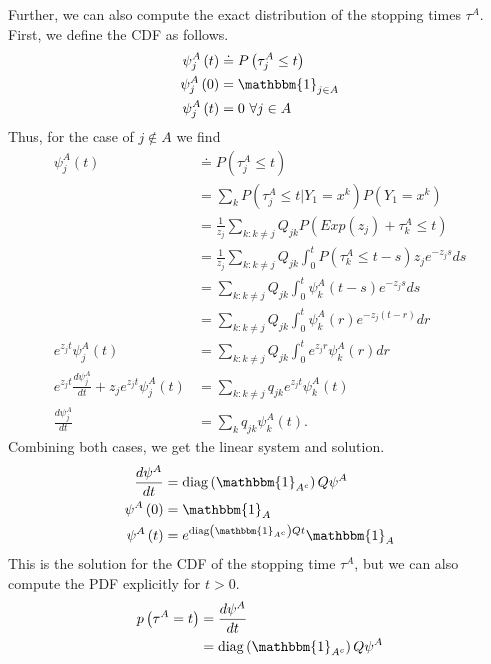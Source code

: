 Further, we can also compute the exact distribution of the stopping times $\tau^A$. First, we define the CDF as follows.
\begin{align}
\psi_j^A\left(t\right) &\doteq P\left(\tau^A_j \leq t\right) \\
\psi_j^A\left(0\right) &= \mathbbm{1}_{j\in A} \\
\psi_j^A\left(t\right) &= 0\text{  }\forall j \in A                        
\end{align}
Thus, for the case of $j \not\in A$ we find
\begin{align}
\psi_j^A\left(t\right) &\doteq P\left(\tau^A_j \leq t\right) \\
                       &= \sum_k P\left(\tau^A_j \leq t | Y_1 = x^k\right) P\left(Y_1 = x^k\right) \\ 
                       &= \frac{1}{z_j}\sum_{k: k \neq j} Q_{jk} P\left(Exp\left(z_j\right) + \tau^A_k \leq t\right)  \\
                       &= \frac{1}{z_j}\sum_{k: k \neq j} Q_{jk} \int^t_0 P\left(\tau^A_k \leq t - s\right) z_j e^{-z_j s} ds  \\
                       &= \sum_{k: k \neq j} Q_{jk} \int^t_0\psi^A_k\left(t-s\right)e^{-z_j s} ds  \\
                       &= \sum_{k: k \neq j} Q_{jk} \int^t_0\psi^A_k\left(r\right)e^{-z_j\left(t-r\right)} dr  \\
e^{z_jt}\psi^A_j\left(t\right) &= \sum_{k: k \neq j} Q_{jk} \int^t_0 e^{z_jr}\psi^A_k\left(r\right) dr  \\
e^{z_jt}\frac{d\psi^A_j}{dt} + z_j e^{z_j t} \psi^A_j\left(t\right) &= \sum_{k: k \neq j} q_{jk} e^{z_jt}\psi^A_k\left(t\right)  \\
\frac{d\psi^A_j}{dt} &= \sum_{k} q_{jk} \psi^A_k\left(t\right).
\end{align}
Combining both cases, we get the linear system and solution.
\begin{align}
        \frac{d\psi^A}{dt} &= \diag\left(\mathbbm{1}_{A^c}\right)Q\psi^A \\
        \psi^A\left(0\right) &= \mathbbm{1}_{A} \\
        \psi^A\left(t\right) &= e^{\diag\left(\mathbbm{1}_{A^c}\right)Qt} \mathbbm{1}_{A} \\ 
\end{align}
This is the solution for the CDF of the stopping time $\tau^A$, but we can also compute the PDF explicitly for $t > 0$.
\begin{align}
        p\left(\tau^A = t\right) &= \frac{d\psi^A}{dt} \\
        &= \diag\left(\mathbbm{1}_{A^c}\right)Q\psi^A
\end{align} 


